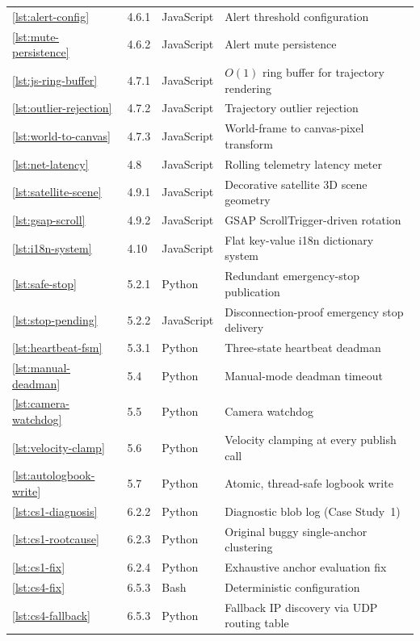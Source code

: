 \begin{longtable}{@{}L{2.6cm}L{1.4cm}L{1.8cm}L{7.4cm}@{}}
\ref{lst:alert-config} & 4.6.1 & JavaScript & Alert threshold configuration \\
\ref{lst:mute-persistence} & 4.6.2 & JavaScript & Alert mute persistence \\
\ref{lst:js-ring-buffer} & 4.7.1 & JavaScript & $O(1)$ ring buffer for trajectory rendering \\
\ref{lst:outlier-rejection} & 4.7.2 & JavaScript & Trajectory outlier rejection \\
\ref{lst:world-to-canvas} & 4.7.3 & JavaScript & World-frame to canvas-pixel transform \\
\ref{lst:net-latency} & 4.8 & JavaScript & Rolling telemetry latency meter \\
\ref{lst:satellite-scene} & 4.9.1 & JavaScript & Decorative satellite 3D scene geometry \\
\ref{lst:gsap-scroll} & 4.9.2 & JavaScript & GSAP ScrollTrigger-driven rotation \\
\ref{lst:i18n-system} & 4.10 & JavaScript & Flat key-value i18n dictionary system \\
\ref{lst:safe-stop} & 5.2.1 & Python & Redundant emergency-stop publication \\
\ref{lst:stop-pending} & 5.2.2 & JavaScript & Disconnection-proof emergency stop delivery \\
\ref{lst:heartbeat-fsm} & 5.3.1 & Python & Three-state heartbeat deadman \\
\ref{lst:manual-deadman} & 5.4 & Python & Manual-mode deadman timeout \\
\ref{lst:camera-watchdog} & 5.5 & Python & Camera watchdog \\
\ref{lst:velocity-clamp} & 5.6 & Python & Velocity clamping at every publish call \\
\ref{lst:autologbook-write} & 5.7 & Python & Atomic, thread-safe logbook write \\
\ref{lst:cs1-diagnosis} & 6.2.2 & Python & Diagnostic blob log (Case Study~1) \\
\ref{lst:cs1-rootcause} & 6.2.3 & Python & Original buggy single-anchor clustering \\
\ref{lst:cs1-fix} & 6.2.4 & Python & Exhaustive anchor evaluation fix \\
\ref{lst:cs4-fix} & 6.5.3 & Bash & Deterministic  configuration \\
\ref{lst:cs4-fallback} & 6.5.3 & Python & Fallback IP discovery via UDP routing table \\
\bottomrule
\end{longtable}
\endgroup

